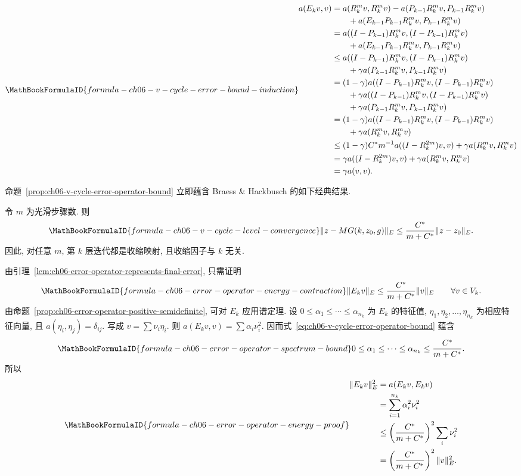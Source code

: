 \begin{Proof}
\[
\MathBookFormulaID{formula-ch06-v-cycle-error-bound-induction}
\begin{aligned}
a(E_kv,v)
&=a(R_k^mv,R_k^mv)-a(P_{k-1}R_k^mv,P_{k-1}R_k^mv)\\
&\qquad+a(E_{k-1}P_{k-1}R_k^mv,P_{k-1}R_k^mv)\\
&=a((I-P_{k-1})R_k^mv,(I-P_{k-1})R_k^mv)\\
&\qquad+a(E_{k-1}P_{k-1}R_k^mv,P_{k-1}R_k^mv)\\
&\leq a((I-P_{k-1})R_k^mv,(I-P_{k-1})R_k^mv)\\
&\qquad+\gamma a(P_{k-1}R_k^mv,P_{k-1}R_k^mv)\\
&=(1-\gamma)a((I-P_{k-1})R_k^mv,(I-P_{k-1})R_k^mv)\\
&\qquad+\gamma a((I-P_{k-1})R_k^mv,(I-P_{k-1})R_k^mv)\\
&\qquad+\gamma a(P_{k-1}R_k^mv,P_{k-1}R_k^mv)\\
&=(1-\gamma)a((I-P_{k-1})R_k^mv,(I-P_{k-1})R_k^mv)\\
&\qquad+\gamma a(R_k^mv,R_k^mv)\\
&\leq(1-\gamma)C^*m^{-1}a((I-R_k^{2m})v,v)
 +\gamma a(R_k^mv,R_k^mv)\\
&=\gamma a((I-R_k^{2m})v,v)+\gamma a(R_k^mv,R_k^mv)\\
&=\gamma a(v,v).
\end{aligned}
\]
\end{Proof}

命题~\ref{prop:ch06-v-cycle-error-operator-bound} 立即蕴含 Braess \& Hackbusch 的如下经典结果.

\begin{Theorem}
\label{thm:ch06-v-cycle-level-convergence}
令 $m$ 为光滑步骤数. 则
\[
\MathBookFormulaID{formula-ch06-v-cycle-level-convergence}
\|z-MG(k,z_0,g)\|_E
\leq\frac{C^*}{m+C^*}\|z-z_0\|_E.
\]
因此, 对任意 $m$, 第 $k$ 层迭代都是收缩映射, 且收缩因子与 $k$ 无关.
\end{Theorem}
\begin{Proof}
由引理~\ref{lem:ch06-error-operator-represents-final-error}, 只需证明
\[
\MathBookFormulaID{formula-ch06-error-operator-energy-contraction}
\|E_kv\|_E\leq\frac{C^*}{m+C^*}\|v\|_E
\qquad\forall v\in V_k.
\]
由命题~\ref{prop:ch06-error-operator-positive-semidefinite}, 可对 $E_k$ 应用谱定理. 设 $0\leq\alpha_1\leq\cdots\leq\alpha_{n_k}$ 为 $E_k$ 的特征值, $\eta_1,\eta_2,\ldots,\eta_{n_k}$ 为相应特征向量, 且 $a(\eta_i,\eta_j)=\delta_{ij}$. 写成 $v=\sum\nu_i\eta_i$. 则 $a(E_kv,v)=\sum\alpha_i\nu_i^2$. 因而式~\eqref{eq:ch06-v-cycle-error-operator-bound} 蕴含
\[
\MathBookFormulaID{formula-ch06-error-operator-spectrum-bound}
0\leq\alpha_1\leq\cdots\leq\alpha_{n_k}
\leq\frac{C^*}{m+C^*}.
\]
所以
\[
\MathBookFormulaID{formula-ch06-error-operator-energy-proof}
\begin{aligned}
\|E_kv\|_E^2
&=a(E_kv,E_kv)\\
&=\sum_{i=1}^{n_k}\alpha_i^2\nu_i^2\\
&\leq\left(\frac{C^*}{m+C^*}\right)^2\sum_i\nu_i^2\\
&=\left(\frac{C^*}{m+C^*}\right)^2\|v\|_E^2.
\end{aligned}
\]
\end{Proof}
